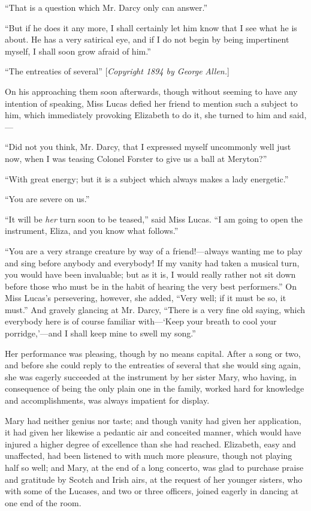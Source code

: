 \documentclass[12pt,openright]{book}
\begin{document}
“That is a question which Mr. Darcy only can answer.”

“But if he does it any more, I shall certainly let him know that I see what he is about. He has a very satirical eye, and if I do not begin by being impertinent myself, I shall soon grow afraid of him.”

“The entreaties of several” [\textit{Copyright 1894 by George}\textit{ }\textit{Allen.}]

On his approaching them soon afterwards, though without seeming to have any intention of speaking, Miss Lucas defied her friend to mention such a subject to him, which immediately provoking Elizabeth to do it, she turned to him and said,—

“Did not you think, Mr. Darcy, that I expressed myself uncommonly well just now, when I was teasing Colonel Forster to give us a ball at Meryton?”

“With great energy; but it is a subject which always makes a lady energetic.”

“You are severe on us.”

“It will be \textit{her} turn soon to be teased,” said Miss Lucas. “I am going to open the instrument, Eliza, and you know what follows.”

“You are a very strange creature by way of a friend!—always wanting me to play and sing before anybody and everybody! If my vanity had taken a musical turn, you would have been invaluable; but as it is, I would really rather not sit down before those who must be in the habit of hearing the very best performers.” On Miss Lucas’s persevering, however, she added, “Very well; if it must be so, it must.” And gravely glancing at Mr. Darcy, “There is a very fine old saying, which everybody here is of course familiar with—‘Keep your breath to cool your porridge,’—and I shall keep mine to swell my song.”

Her performance was pleasing, though by no means capital. After a song or two, and before she could reply to the entreaties of several that she would sing again, she was eagerly succeeded at the instrument by her sister Mary, who having, in consequence of being the only plain one in the family, worked hard for knowledge and accomplishments, was always impatient for display.

Mary had neither genius nor taste; and though vanity had given her application, it had given her likewise a pedantic air and conceited manner, which would have injured a higher degree of excellence than she had reached. Elizabeth, easy and unaffected, had been listened to with much more pleasure, though not playing half so well; and Mary, at the end of a long concerto, was glad to purchase praise and gratitude by Scotch and Irish airs, at the request of her younger sisters, who with some of the Lucases, and two or three officers, joined eagerly in dancing at one end of the room.
\end{document}
